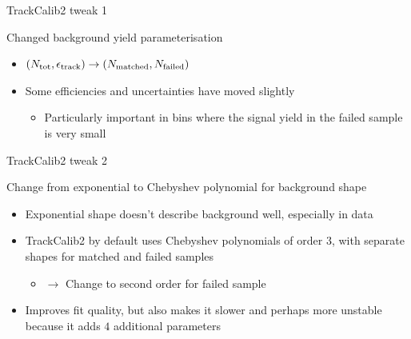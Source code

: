 \documentclass[xcolor={dvipsnames}]{beamer}
\begin{document}
\begin{frame}{TrackCalib2 tweak 1}
  \vspace{0.0cm}
  \begin{center}
    {\large Changed background yield parameterisation}
  \end{center}
  \vspace{0.5cm}
  \begin{itemize}
    \setlength\itemsep{1.0em}
    \item{$(N_{\rm tot}, \epsilon_{\rm track})\to(N_{\rm matched}, N_{\rm failed})$}
    \item{Some efficiencies and uncertainties have moved slightly}
    \begin{itemize}
      \item{Particularly important in bins where the signal yield in the failed sample is very small}
    \end{itemize}
  \end{itemize}
\end{frame}

\begin{frame}{TrackCalib2 tweak 2}
  \vspace{0.0cm}
  \begin{center}
    {\large Change from exponential to Chebyshev polynomial for background shape}
  \end{center}
  \vspace{0.5cm}
  \begin{itemize}
    \setlength\itemsep{1.0em}
    \item{Exponential shape doesn't describe background well, especially in data}
    \item{TrackCalib2 by default uses Chebyshev polynomials of order $3$, with separate shapes for matched and failed samples}
    \begin{itemize}
      \item{$\to$ Change to second order for failed sample}
    \end{itemize}
    \item{Improves fit quality, but also makes it slower and perhaps more unstable because it adds $4$ additional parameters}
  \end{itemize}
\end{frame}
\end{document}
